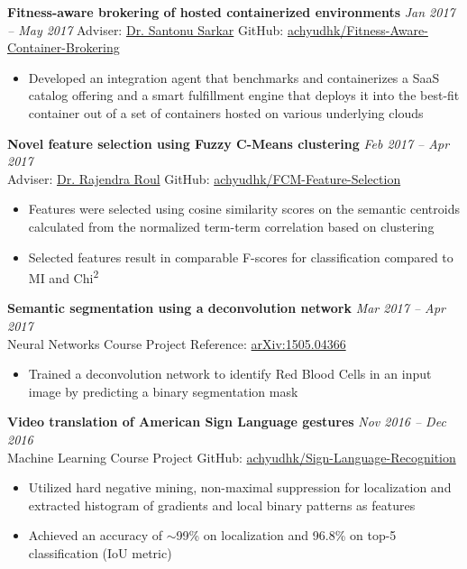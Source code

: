 \documentclass[10pt]{article}
\newenvironment{innerlist}[1][\enskip\textbullet]%
        {\begin{itemize}[#1,leftmargin=*,parsep=0pt,itemsep=0pt,topsep=0pt,partopsep=0pt]}
        {\end{itemize}}
\newcommand{\halfblankline}{\quad\vspace{-0.5\baselineskip}\pagebreak[3]}
\begin{document}
\halfblankline

\textbf{Fitness-aware brokering of hosted containerized environments} \hfill \emph{Jan 2017 -- May 2017}
Adviser: \href{https://scholar.google.co.in/citations?user=8UNP6BIAAAAJ}{Dr. Santonu Sarkar} \hfill GitHub: \href{https://github.com/achyudhk/Fitness-Aware-Container-Brokering}{achyudhk/Fitness-Aware-Container-Brokering}
\vspace{0.5mm}
\begin{innerlist}
\item Developed an integration agent that benchmarks and containerizes a SaaS catalog offering and a smart fulfillment engine that deploys it into the best-fit container out of a set of containers hosted on various underlying clouds
\end{innerlist}

\halfblankline

\textbf{Novel feature selection using Fuzzy C-Means clustering} \hfill \emph{Feb 2017 -- Apr 2017}\\
Adviser: \href{http://www.bits-pilani.ac.in/goa/rkroul/Profile}{Dr. Rajendra Roul} \hfill GitHub: \href{https://github.com/achyudhk/FCM-Feature-Selection}{achyudhk/FCM-Feature-Selection}
\vspace{0.5mm}
\begin{innerlist}
\item Features were selected using cosine similarity scores on the semantic centroids calculated from the normalized term-term correlation based on clustering
\item Selected features result in comparable F-scores for classification compared to MI and Chi\textsuperscript{2}
\end{innerlist}

\halfblankline

\textbf{Semantic segmentation using a deconvolution network} \hfill \emph{Mar 2017 -- Apr 2017}\\
Neural Networks Course Project \hfill Reference: \href{https://arxiv.org/abs/1505.04366}{arXiv:1505.04366}
\vspace{0.5mm}
\begin{innerlist}
\item Trained a deconvolution network to identify Red Blood Cells in an input image by predicting a binary segmentation mask
\end{innerlist}

\halfblankline

\textbf{Video translation of American Sign Language gestures} \hfill \emph{Nov 2016 -- Dec 2016}\\
Machine Learning Course Project \hfill GitHub: \href{https://github.com/achyudhk/Sign-Language-Recognition}{achyudhk/Sign-Language-Recognition}
\vspace{0.5mm}
\begin{innerlist}
\item Utilized hard negative mining, non-maximal suppression for localization and extracted histogram of gradients and local binary patterns as features
\item Achieved an accuracy of $\sim$99\% on localization and 96.8\% on top-5 classification (IoU metric)
\end{innerlist}
\end{document}
